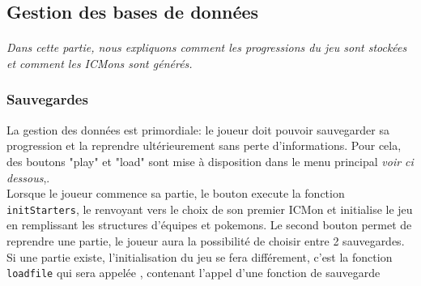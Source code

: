 \documentclass[12pt,a4paper, twoside]{article}
\begin{document}
\subsection{Gestion des bases de données}
\paragraph{} \emph{Dans cette partie, nous expliquons comment les progressions du jeu sont stockées et comment les ICMons sont générés.}
    \subsubsection{Sauvegardes}
     La gestion des données est primordiale: le joueur doit pouvoir sauvegarder sa progression et la reprendre ultérieurement sans perte d'informations.
     Pour cela, des boutons "play" et "load" sont mise à disposition dans le menu principal \emph{voir ci dessous},.\\
     Lorsque le joueur commence sa partie, le bouton execute la fonction \texttt{initStarters}, le renvoyant vers le choix de son premier ICMon et initialise le jeu en remplissant les structures d'équipes et pokemons.
     Le second bouton permet de reprendre une partie, le joueur aura la possibilité de choisir entre 2 sauvegardes. Si une partie existe, l'initialisation du jeu se fera différement, c'est la fonction \texttt{loadfile} qui sera appelée , contenant l'appel d'une fonction de sauvegarde\\
\end{document}
